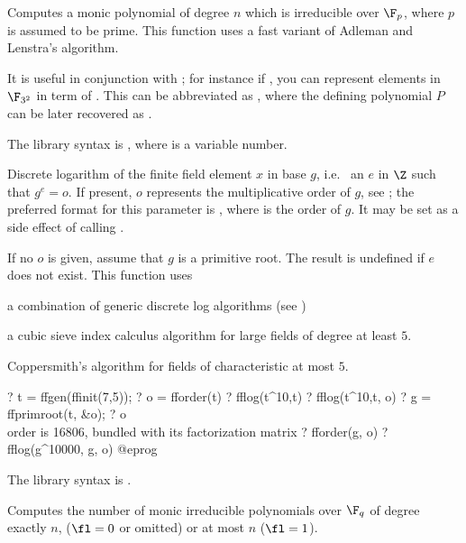 \label{se:ffinit}
Computes a monic polynomial of degree $n$ which is irreducible over
 $\F_p$, where $p$ is assumed to be prime. This function uses a fast variant
 of Adleman and Lenstra's algorithm.

It is useful in conjunction with ; for instance if
, you can represent elements in $\F_{3^2}$ in term of
. This can be abbreviated as
, where the defining polynomial $P$ can be later
recovered as .

The library syntax is , where  is a variable number.

\label{se:fflog}
Discrete logarithm of the finite field element $x$ in base $g$, i.e.~
an $e$ in $\Z$ such that $g^e = o$. If
present, $o$ represents the multiplicative order of $g$, see
; the preferred format for
this parameter is , where  is the
order of $g$. It may be set as a side effect of calling .

If no $o$ is given, assume that $g$ is a primitive root. The result is
undefined if $e$ does not exist. This function uses

\item a combination of generic discrete log algorithms (see )

\item a cubic sieve index calculus algorithm for large fields of degree at
least $5$.

\item Coppersmith's algorithm for fields of characteristic at most $5$.

\bprog
? t = ffgen(ffinit(7,5));
? o = fforder(t)
? fflog(t^10,t)
? fflog(t^10,t, o)
? g = ffprimroot(t, &o);
? o   \\ order is 16806, bundled with its factorization matrix
? fforder(g, o)
? fflog(g^10000, g, o)
@eprog

The library syntax is .

\label{se:ffnbirred}
Computes the number of monic irreducible polynomials over $\F_q$ of degree exactly $n$,
($\fl=0$ or omitted) or at most $n$ ($\fl=1$).

